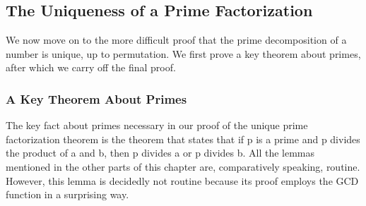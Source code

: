 \documentclass[11pt]{book}
\newcommand{\pubdefaulttextsize}{\large}
\begin{document}
\subsection{The Uniqueness of a Prime Factorization}
\pubdefaulttextsize
We now move on to the more difficult proof that the prime decomposition
of a number is unique, up to permutation.  We first prove a key theorem
about primes, after which we  carry off the final proof.
\subsubsection{A Key Theorem About Primes}
\pubdefaulttextsize
The key fact about primes necessary in our proof of the unique
prime factorization theorem is the theorem  that states that
if p is a prime and p divides the product of a and b, then p
divides a or p divides b.  All the lemmas mentioned in
the other parts of this chapter are,  comparatively speaking,
routine.  However, this lemma is decidedly not routine because
its proof employs the GCD function in a surprising way.
\end{document}
